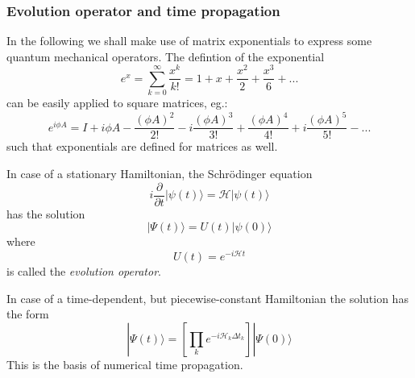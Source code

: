 \documentclass[11.5pt,a4paper]{article}
\begin{document}
\subsubsection{Evolution operator and time propagation}
In the following we shall make use of matrix exponentials to express some quantum mechanical operators. The defintion of the exponential
\begin{equation}
 e^x = \sum_{k=0}^\infty \frac{x^k}{k!} = 1 + x + \frac{x^2}{2} + \frac{x^3}{6} + ...
\end{equation}
can be easily applied to square matrices, eg.:
\begin{equation}
 e^{i \phi A } = I + i \phi A - \frac{(\phi A)^2}{2!} - i \frac{(\phi A)^3}{3!} + \frac{(\phi A)^4}{4!} + i \frac{(\phi A)^5}{5!} - ...
\end{equation}
such that exponentials are defined for matrices as well.

\label{sec-dynamics}
In case of a stationary Hamiltonian, the Schr\"odinger equation 
\begin{equation}
  i \frac{\partial}{\partial t} | \psi(t) \rangle = \mathcal{H} |\psi(t) \rangle
\end{equation}
has the solution
\begin{equation}
  |\Psi(t)\rangle = U(t) | \psi(0) \rangle
  \label{eq-psi-general-solution}
\end{equation}
where 
\begin{equation}
 U(t) = e^{-i \mathcal{H} t}
  \label{eq-evolution}
\end{equation}
is called the \emph{evolution operator}.

In case of a time-dependent, but piecewise-constant Hamiltonian the solution has the form
\begin{equation}
 |\Psi(t)\rangle = \left[ \prod_k e^{-i\mathcal{H}_k \Delta t_k} \right] |\Psi(0)\rangle
  \label{eq-time-propagation}
\end{equation}
This is the basis of numerical time propagation.
\end{document}
